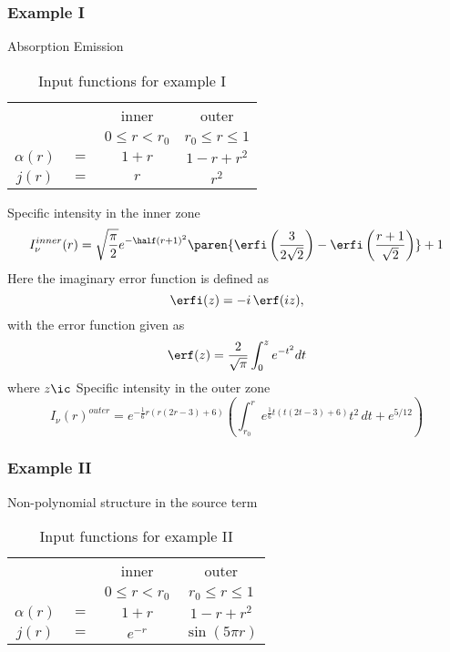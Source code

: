 \subsubsection{Example I}
Absorption
Emission
\begin{table}[htbp]
\caption[Input functions for example I]{Input functions for example I}
\begin{center}
\begin{tabular}{cccc}
%
 && inner & outer \\
 && $0\le r < r_{0}$ & $r_{0}\le r \le 1$ \\\hline
% 
  $\alpha(r)$ & $=$ & $1+r$ & $1-r+r^{2}$ \\
% 
  $j(r)$ & $=$ & $r$ & $r^{2}$
%
\end{tabular}
\end{center}
\label{tab:fcns:I}
\end{table}
%
Specific intensity in the inner zone
  \begin{equation}
    I_{\nu}^{inner}(r) = \sqrt{\frac{\pi }{2}} e^{-\half (r+1)^2} \paren{\erfi\left(\frac{3}{2 \sqrt{2}}\right)-\erfi\left(\frac{r+1}{\sqrt{2}}\right)}+1
  \end{equation}
Here the imaginary error function is defined as
  \begin{equation}
    \erfi (z) = -i \,\erf (iz) ,
  \end{equation}
with the error function given as
  \begin{equation}
    \erf (z) = \frac{2}{\sqrt{\pi}} \int_{0}^{z} e^{-t^{2}} dt
  \end{equation}
where $z\ic$
Specific intensity in the outer zone
  \begin{equation}
    I_{\nu}(r)^{outer} = e^{-\frac{1}{6} r (r (2 r-3)+6)} \left(\int_{r_{0}}^r e^{\frac{1}{6} t (t (2 t-3)+6)} t^2 \, dt+e^{5/12}\right)
  \end{equation}


\subsubsection{Example II}
Non-polynomial structure in the source term
\begin{table}[htbp]
\caption[Input functions for example II]{Input functions for example II}
\begin{center}
\begin{tabular}{cccc}
%
 && inner & outer \\
 && $0\le r < r_{0}$ & $r_{0}\le r \le 1$ \\\hline
% 
  $\alpha(r)$ & $=$ & $1+r$ & $1-r+r^{2}$ \\
% 
  $j(r)$ & $=$ & $e^{-r}$ & $\sin(5\pi r)$
%
\end{tabular}
\end{center}
\label{tab:fcns:II}
\end{table}%

